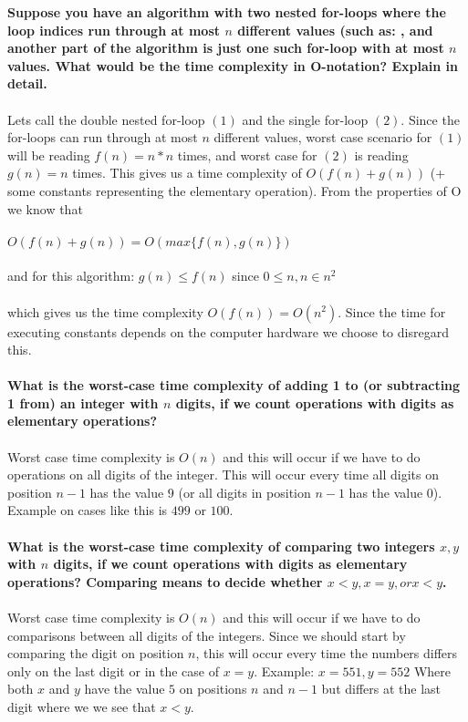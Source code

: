 \documentclass[12pt,oneside,reqno]{amsart}
\begin{document}
\textbf{Suppose you have an algorithm with two nested for-loops where the loop indices run through at most $n$ different values (such as: , and another part of the algorithm is just one such for-loop with at most $n$ values. What would be the time complexity in O-notation? Explain in detail.}\\\\
Lets call the double nested for-loop $(1)$ and the single for-loop $(2)$. Since the for-loops can run through at most $n$ different values, worst case scenario for $(1)$ will be reading $f(n)=n*n$ times, and worst case for $(2)$ is reading $g(n)=n$ times. This gives us a time complexity of $O(f(n)+g(n))$ (+ some constants representing the elementary operation). From the properties of O we know that\\\\ 
$O(f(n)+g(n))=O(max\{f(n), g(n)\})$\\\\
and for this algorithm: $g(n) \leq f(n)$ since $0 \leq n, n\in n^2$ \\\\
which gives us the time complexity $O(f(n))=O(n^2)$. Since the time for executing constants depends on the computer hardware we choose to disregard this.\\\\

\textbf{What is the worst-case time complexity of adding 1 to (or subtracting 1 from) an integer with $n$ digits, if we count operations with digits as elementary operations?}\\\\
Worst case time complexity is $O(n)$ and this will occur if we have to do operations on all digits of the integer. This will occur every time all digits on position $n-1$ has the value $9$ (or all digits in position $n-1$ has the value $0$). Example on cases like this is $499$ or $100$.\\\\

\textbf{What is the worst-case time complexity of comparing two integers $x, y$ with $n$ digits, if we count operations with digits as elementary operations? Comparing means to decide whether $x < y, x = y, or x < y$.}\\\\
Worst case time complexity is $O(n)$ and this will occur if we have to do comparisons between all digits of the integers. Since we should start by comparing the digit on position $n$, this will occur every time the numbers differs only on the last digit or in the case of $x=y$. Example: $x=551, y=552$ Where both $x$ and $y$ have the value $5$ on positions $n$ and $n-1$ but differs at the last digit where we we see that $x<y$.\\\\
\end{document}
